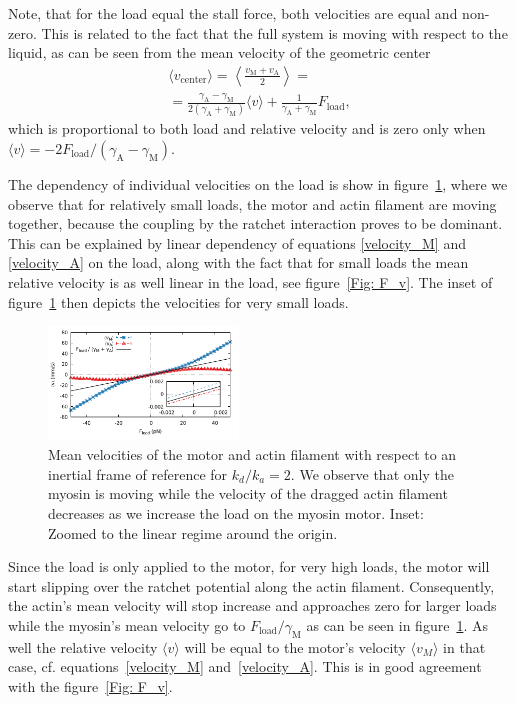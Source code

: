 \documentclass[aps,pre,twocolumn,showpacs,showkeys]{revtex4-1}
\begin{document}
Note, that for the load equal the stall force, both velocities are equal and non-zero.
This is related to the fact that the full system is moving with respect to the liquid, as can be seen from the mean velocity of the geometric center 
\begin{multline*}
\langle v_\text{center} \rangle = \left\langle \frac{ v_\text{M} + v_\text{A} }{2} \right\rangle 
= \\
= \frac{ \gamma_\text{A} - \gamma_\text{M} }{ 2 ( \gamma_\text{A} + \gamma_\text{M} ) } \langle v \rangle + \frac{1}{ \gamma_\text{A} + \gamma_\text{M} } F_\text{load}
, 
\end{multline*}
which is proportional to both load and relative velocity and is zero only when $\langle v \rangle = - 2 F_\text{load} / ( \gamma_\text{A} - \gamma_\text{M} )$.

The dependency of individual velocities on the load is show in figure~\ref{Fig: ind_v}, 
where we observe that for relatively small loads, the motor and actin filament are moving together, because the coupling by the ratchet interaction proves to be dominant. 
This can be explained by linear dependency of equations \eqref{velocity_M} and \eqref{velocity_A} on the load, 
along with the fact that for small loads the mean relative velocity is as well linear in the load, see figure~\ref{Fig: F_v}. 
The inset of figure~\ref{Fig: ind_v} then depicts the velocities for very small loads.
\begin{figure}[t]
\centering
\includegraphics[width=0.45\textwidth,height=!]{individual_velocities}
\caption{Mean velocities of the motor and actin filament with respect to an inertial frame of reference for $k_d/k_a = 2$.
We observe that only the myosin is moving while the velocity of the dragged actin filament decreases as we increase the load on the myosin motor.
Inset: Zoomed to the linear regime around the origin.
}
\label{Fig: ind_v} 
\end{figure}

Since the load is only applied to the motor, for very high loads, the motor will start slipping over the ratchet potential along the actin filament. 
Consequently, the actin's mean velocity will stop increase and approaches zero for larger loads 
while the myosin's mean velocity go to $F_\text{load}/\gamma_\text{M}$ as can be seen in figure~\ref{Fig: ind_v}. 
As well the relative velocity $\langle v \rangle$ will be equal to the motor's velocity $\langle v_M \rangle$ in that case, 
cf. equations~\eqref{velocity_M} and~\eqref{velocity_A}.
This is in good agreement with the figure~\ref{Fig: F_v}.
\end{document}
